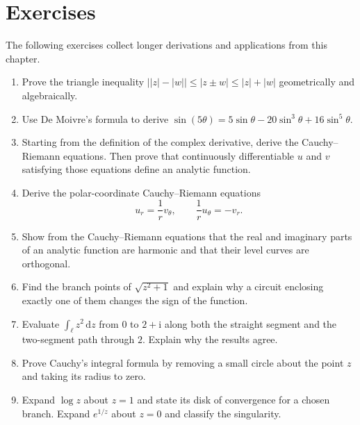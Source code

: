 \section*{Exercises}
The following exercises collect longer derivations and applications from this chapter.

\renewcommand{\theenumi}{\thechapter.\arabic{enumi}}
\renewcommand{\labelenumi}{\theenumi.}
\begin{enumerate}
    \item Prove the triangle inequality $\bigl||z|-|w|\bigr|\leq|z\pm w|\leq|z|+|w|$ geometrically and algebraically.

    \item Use De Moivre's formula to derive $\sin(5\theta)=5\sin\theta-20\sin^3\theta+16\sin^5\theta$.

    \item Starting from the definition of the complex derivative, derive the Cauchy--Riemann equations. Then prove that continuously differentiable $u$ and $v$ satisfying those equations define an analytic function.

    \item Derive the polar-coordinate Cauchy--Riemann equations
    \begin{equation*}
    u_r=\frac{1}{r}v_\theta,\qquad \frac{1}{r}u_\theta=-v_r.
    \end{equation*}

    \item Show from the Cauchy--Riemann equations that the real and imaginary parts of an analytic function are harmonic and that their level curves are orthogonal.

    \item Find the branch points of $\sqrt{z^2+1}$ and explain why a circuit enclosing exactly one of them changes the sign of the function.

    \item Evaluate $\int_\ell z^2\,\mathrm{d}z$ from $0$ to $2+\mathrm{i}$ along both the straight segment and the two-segment path through $2$. Explain why the results agree.

    \item Prove Cauchy's integral formula by removing a small circle about the point $z$ and taking its radius to zero.

    \item Expand $\log z$ about $z=1$ and state its disk of convergence for a chosen branch. Expand $e^{1/z}$ about $z=0$ and classify the singularity.


\end{enumerate}
